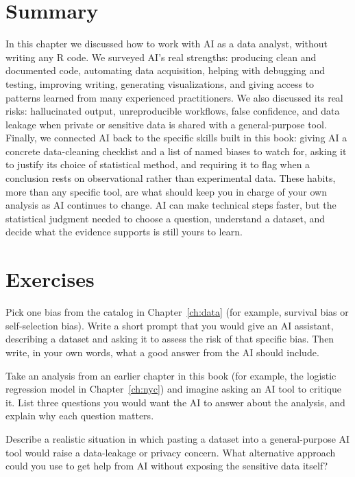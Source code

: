\section{Summary}

In this chapter we discussed how to work with AI as a data analyst,
without writing any R code. We surveyed AI's real strengths: producing
clean and documented code, automating data acquisition, helping with
debugging and testing, improving writing, generating visualizations,
and giving access to patterns learned from many experienced
practitioners. We also discussed its real risks: hallucinated output,
unreproducible workflows, false confidence, and data
leakage when private or sensitive data is shared with a general-purpose
tool. Finally, we connected AI back to the specific skills built in
this book: giving AI a concrete data-cleaning checklist and a list of
named biases to watch for, asking it to justify its choice of
statistical method, and requiring it to flag when a conclusion rests on
observational rather than experimental data. These habits, more than
any specific tool, are what should keep you in charge of your own
analysis as AI continues to change. AI can make technical steps faster,
but the statistical judgment needed to choose a question, understand a
dataset, and decide what the evidence supports is still yours to learn.

\section{Exercises}

\begin{exercise}
Pick one bias from the catalog in Chapter~\ref{ch:data} (for example,
  survival bias or self-selection bias). Write a short prompt that you
  would give an AI assistant, describing a dataset and asking it to
  assess the risk of that specific bias. Then write, in your own
  words, what a good answer from the AI should include.
\end{exercise}

\begin{exercise}
Take an analysis from an earlier chapter in this book (for example,
  the logistic regression model in Chapter~\ref{ch:nyc}) and imagine
  asking an AI tool to critique it. List three questions you would
  want the AI to answer about the analysis, and explain why each
  question matters.
\end{exercise}

\begin{exercise}
Describe a realistic situation in which pasting a dataset into a
  general-purpose AI tool would raise a data-leakage or privacy
  concern. What alternative approach could you use to get help from
  AI without exposing the sensitive data itself?
\end{exercise}

